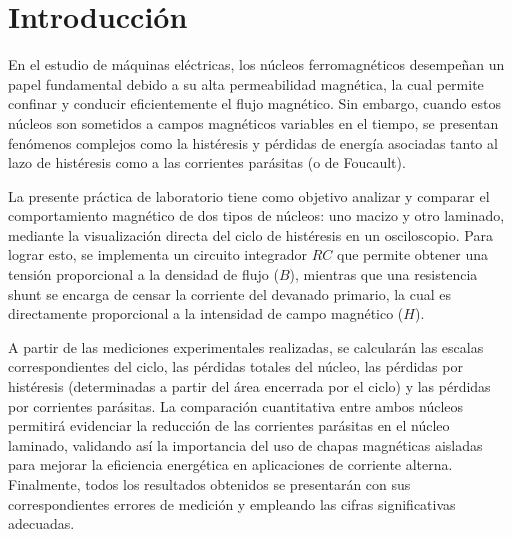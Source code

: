 \section{Introducción}


En el estudio de máquinas eléctricas, los núcleos ferromagnéticos desempeñan un papel fundamental debido a su alta permeabilidad magnética, la cual permite confinar y conducir eficientemente el flujo magnético. Sin embargo, cuando estos núcleos son sometidos a campos magnéticos variables en el tiempo, se presentan fenómenos complejos como la histéresis y pérdidas de energía asociadas tanto al lazo de histéresis como a las corrientes parásitas (o de Foucault). 

La presente práctica de laboratorio tiene como objetivo analizar y comparar el comportamiento magnético de dos tipos de núcleos: uno macizo y otro laminado, mediante la visualización directa del ciclo de histéresis en un osciloscopio. Para lograr esto, se implementa un circuito integrador $RC$ que permite obtener una tensión proporcional a la densidad de flujo ($B$), mientras que una resistencia shunt se encarga de censar la corriente del devanado primario, la cual es directamente proporcional a la intensidad de campo magnético ($H$).

A partir de las mediciones experimentales realizadas, se calcularán las escalas correspondientes del ciclo, las pérdidas totales del núcleo, las pérdidas por histéresis (determinadas a partir del área encerrada por el ciclo) y las pérdidas por corrientes parásitas. La comparación cuantitativa entre ambos núcleos permitirá evidenciar la reducción de las corrientes parásitas en el núcleo laminado, validando así la importancia del uso de chapas magnéticas aisladas para mejorar la eficiencia energética en aplicaciones de corriente alterna. Finalmente, todos los resultados obtenidos se presentarán con sus correspondientes errores de medición y empleando las cifras significativas adecuadas.
